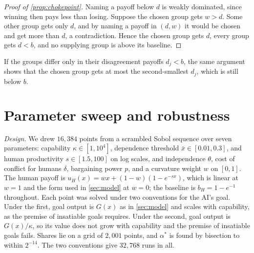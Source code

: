 \documentclass[article, 11pt, reqno]{amsart}
\theoremstyle{named}
\newcommand{\bH}{b_H}
\theoremstyle{plain}
\begin{document}
\begin{proof}[Proof of \cref{prop:chokepoint}]
Naming a payoff below $d$ is weakly dominated, since winning then pays less than losing. Suppose the chosen group gets $w > d$. Some other group gets only $d$, and by naming a payoff in $(d, w)$ it would be chosen and get more than $d$, a contradiction. Hence the chosen group gets $d$, every group gets $d < b$, and no supplying group is above its baseline.
\end{proof}

If the groups differ only in their disagreement payoffs $d_j < b$, the same argument shows that the chosen group gets at most the second-smallest $d_j$, which is still below $b$.

\section{Parameter sweep and robustness}\label{app:sweep}
\textit{Design.} We drew $16{,}384$ points from a scrambled Sobol sequence over seven parameters: capability $\kappa \in [1, 10^4]$, dependence threshold $\bar{x} \in [0.01, 0.3]$, and human productivity $s \in [1.5, 100]$ on log scales, and independence $\theta$, cost of conflict for humans $\delta$, bargaining power $p$, and a curvature weight $w$ on $[0,1]$. The human payoff is $u_H(x) = wx + (1-w)(1 - e^{-sx})$, which is linear at $w = 1$ and the form used in \cref{sec:model} at $w = 0$; the baseline is $\bH = 1 - e^{-1}$ throughout. Each point was solved under two conventions for the AI's goal. Under the first, goal output is $G(x)$ as in \cref{sec:model} and scales with capability, as the premise of insatiable goals requires. Under the second, goal output is $G(x)/\kappa$, so its value does not grow with capability and the premise of insatiable goals fails. Shares lie on a grid of $2{,}001$ points, and $\alpha^*$ is found by bisection to within $2^{-14}$. The two conventions give $32{,}768$ runs in all.
\end{document}
